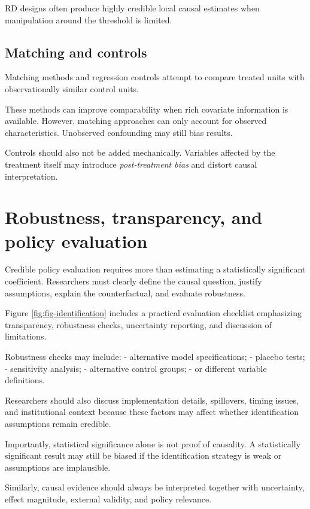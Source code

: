 \documentclass[
  11pt,
  oneside]{book}
\begin{document}
RD designs often produce highly credible local causal estimates when manipulation around the threshold is limited.

\subsection{Matching and controls}\label{matching-and-controls}

Matching methods and regression controls attempt to compare treated units with observationally similar control units.

These methods can improve comparability when rich covariate information is available. However, matching approaches can only account for observed characteristics. Unobserved confounding may still bias results.

Controls should also not be added mechanically. Variables affected by the treatment itself may introduce \emph{post-treatment bias} and distort causal interpretation.

\section{Robustness, transparency, and policy evaluation}\label{robustness-transparency-and-policy-evaluation}

Credible policy evaluation requires more than estimating a statistically significant coefficient. Researchers must clearly define the causal question, justify assumptions, explain the counterfactual, and evaluate robustness.

Figure \ref{fig:fig-identification} includes a practical evaluation checklist emphasizing transparency, robustness checks, uncertainty reporting, and discussion of limitations.

Robustness checks may include:
- alternative model specifications;
- placebo tests;
- sensitivity analysis;
- alternative control groups;
- or different variable definitions.

Researchers should also discuss implementation details, spillovers, timing issues, and institutional context because these factors may affect whether identification assumptions remain credible.

Importantly, statistical significance alone is not proof of causality. A statistically significant result may still be biased if the identification strategy is weak or assumptions are implausible.

Similarly, causal evidence should always be interpreted together with uncertainty, effect magnitude, external validity, and policy relevance.
\end{document}
